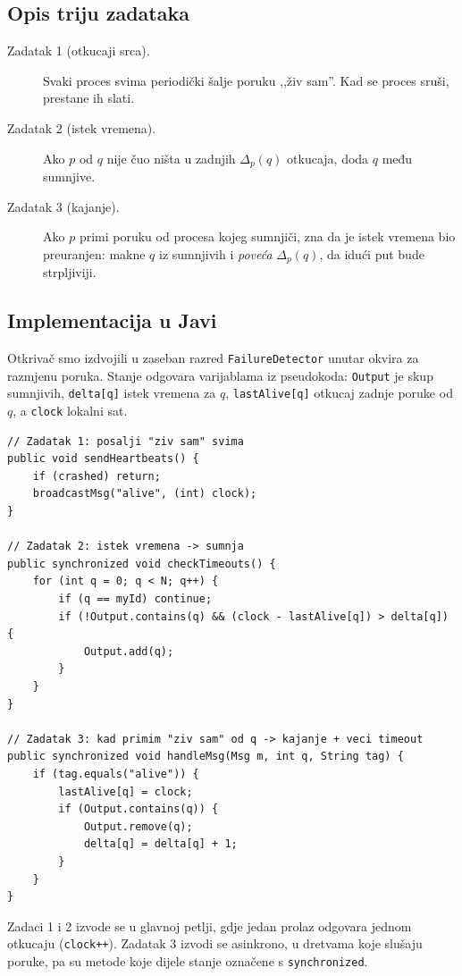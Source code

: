 \documentclass[11pt,a4paper]{article}
\begin{document}
\subsection{Opis triju zadataka}

\begin{description}
  \item[Zadatak 1 (otkucaji srca).] Svaki proces svima periodički šalje poruku
  ,,živ sam''. Kad se proces sruši, prestane ih slati.
  \item[Zadatak 2 (istek vremena).] Ako $p$ od $q$ nije čuo ništa u zadnjih
  $\Delta_p(q)$ otkucaja, doda $q$ među sumnjive.
  \item[Zadatak 3 (kajanje).] Ako $p$ primi poruku od procesa kojeg sumnjiči, zna
  da je istek vremena bio preuranjen: makne $q$ iz sumnjivih i \emph{poveća}
  $\Delta_p(q)$, da idući put bude strpljiviji.
\end{description}

\subsection{Implementacija u Javi}

Otkrivač smo izdvojili u zaseban razred \texttt{FailureDetector} unutar okvira za
razmjenu poruka. Stanje odgovara varijablama iz pseudokoda: \texttt{Output} je
skup sumnjivih, \texttt{delta[q]} istek vremena za $q$, \texttt{lastAlive[q]}
otkucaj zadnje poruke od $q$, a \texttt{clock} lokalni sat.

\begin{lstlisting}
// Zadatak 1: posalji "ziv sam" svima
public void sendHeartbeats() {
    if (crashed) return;
    broadcastMsg("alive", (int) clock);
}

// Zadatak 2: istek vremena -> sumnja
public synchronized void checkTimeouts() {
    for (int q = 0; q < N; q++) {
        if (q == myId) continue;
        if (!Output.contains(q) && (clock - lastAlive[q]) > delta[q]) {
            Output.add(q);
        }
    }
}

// Zadatak 3: kad primim "ziv sam" od q -> kajanje + veci timeout
public synchronized void handleMsg(Msg m, int q, String tag) {
    if (tag.equals("alive")) {
        lastAlive[q] = clock;
        if (Output.contains(q)) {
            Output.remove(q);
            delta[q] = delta[q] + 1;
        }
    }
}
\end{lstlisting}

Zadaci 1 i 2 izvode se u glavnoj petlji, gdje jedan prolaz odgovara jednom
otkucaju (\texttt{clock++}). Zadatak 3 izvodi se asinkrono, u dretvama koje
slušaju poruke, pa su metode koje dijele stanje označene s \texttt{synchronized}.
\end{document}

